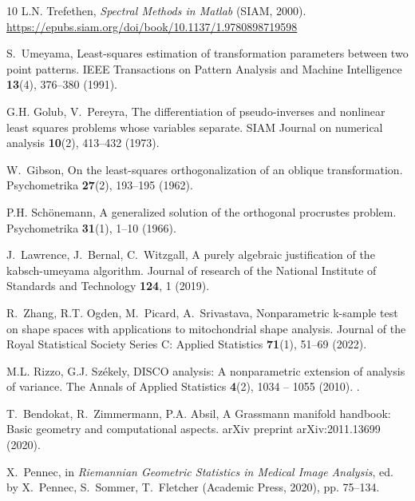 \documentclass[pdflatex,iicol]{sn-jnl}%
\theoremstyle{thmstyleone}%
\theoremstyle{thmstyletwo}%
\theoremstyle{thmstylethree}%
\begin{document}
\begin{thebibliography}{10}
L.N. Trefethen, \emph{Spectral {M}ethods in {M}atlab} (SIAM, 2000).
\newblock \urlprefix\url{https://epubs.siam.org/doi/book/10.1137/1.9780898719598}

S.~Umeyama, Least-squares estimation of transformation parameters between two point patterns.
\newblock IEEE Transactions on Pattern Analysis and Machine Intelligence \textbf{13}(4), 376--380 (1991).
\newblock {}

G.H. Golub, V.~Pereyra, The differentiation of pseudo-inverses and nonlinear least squares problems whose variables separate.
\newblock SIAM Journal on numerical analysis \textbf{10}(2), 413--432 (1973).
\newblock {}

W.~Gibson, On the least-squares orthogonalization of an oblique transformation.
\newblock Psychometrika \textbf{27}(2), 193--195 (1962).
\newblock {}

P.H. Sch{\"o}nemann, A generalized solution of the orthogonal procrustes problem.
\newblock Psychometrika \textbf{31}(1), 1--10 (1966).
\newblock {}

J.~Lawrence, J.~Bernal, C.~Witzgall, A purely algebraic justification of the kabsch-umeyama algorithm.
\newblock Journal of research of the National Institute of Standards and Technology \textbf{124}, 1 (2019).
\newblock {}

R.~Zhang, R.T. Ogden, M.~Picard, A.~Srivastava, Nonparametric k-sample test on shape spaces with applications to mitochondrial shape analysis.
\newblock Journal of the Royal Statistical Society Series C: Applied Statistics \textbf{71}(1), 51--69 (2022).
\newblock {}

M.L. Rizzo, G.J. Sz{\'e}kely, {DISCO analysis: A nonparametric extension of analysis of variance}.
\newblock The Annals of Applied Statistics \textbf{4}(2), 1034 -- 1055 (2010).
\newblock {}.

T.~Bendokat, R.~Zimmermann, P.A. Absil, A {G}rassmann manifold handbook: Basic geometry and computational aspects.
\newblock arXiv preprint arXiv:2011.13699  (2020).
\newblock {}

X.~Pennec, in \emph{Riemannian Geometric Statistics in Medical Image Analysis}, ed. by X.~Pennec, S.~Sommer, T.~Fletcher (Academic Press, 2020), pp. 75--134.
\newblock {}


\end{thebibliography}
\end{document}

